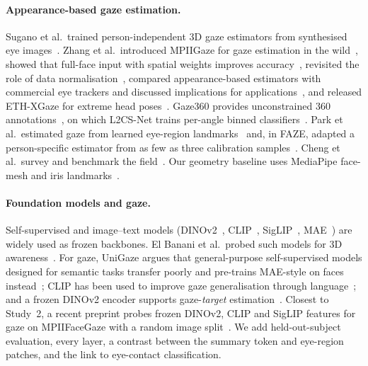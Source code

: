 \documentclass[10pt,twocolumn]{article}
\begin{document}
\paragraph{Appearance-based gaze estimation.}
Sugano et al.\ trained person-independent 3D gaze estimators from synthesised eye images~\cite{sugano2014learning}.
Zhang et al.\ introduced MPIIGaze for gaze estimation in the wild~\cite{zhang2015mpiigaze,zhang2019mpiigaze}, showed
that full-face input with spatial weights improves accuracy~\cite{zhang2017fullface}, revisited the role of data
normalisation~\cite{zhang2018revisiting}, compared appearance-based estimators with commercial eye trackers and
discussed implications for applications~\cite{zhang2019evaluation}, and released ETH-XGaze for extreme head poses~\cite{zhang2020ethxgaze}.
Gaze360 provides unconstrained 360\textdegree{} annotations~\cite{kellnhofer2019gaze360}, on which L2CS-Net trains
per-angle binned classifiers~\cite{abdelrahman2023l2cs}. Park et al.\ estimated gaze from learned eye-region
landmarks~\cite{park2018learning} and, in FAZE, adapted a person-specific estimator from as few as three calibration
samples~\cite{park2019faze}. Cheng et al.\ survey and benchmark the field~\cite{cheng2024survey}. Our geometry
baseline uses MediaPipe face-mesh and iris landmarks~\cite{lugaresi2019mediapipe,kartynnik2019facemesh,ablavatski2020iris}.

\paragraph{Foundation models and gaze.}
Self-supervised and image--text models (DINOv2~\cite{oquab2024dinov2}, CLIP~\cite{radford2021clip},
SigLIP~\cite{zhai2023siglip}, MAE~\cite{he2022mae}) are widely used as frozen backbones. El Banani et al.\ probed such
models for 3D awareness~\cite{elbanani2024probing}. For gaze, UniGaze argues that general-purpose self-supervised
models designed for semantic tasks transfer poorly and pre-trains MAE-style on faces instead~\cite{qin2026unigaze};
CLIP has been used to improve gaze generalisation through language~\cite{yin2024clipgaze}; and a frozen DINOv2 encoder
supports gaze-\emph{target} estimation~\cite{ryan2025gazelle}. Closest to Study~2, a recent preprint probes frozen
DINOv2, CLIP and SigLIP features for gaze on MPIIFaceGaze with a random image split~\cite{shkolnikov2026geometry}.
We add held-out-subject evaluation, every layer, a contrast between the summary token and eye-region patches, and
the link to eye-contact classification.
\end{document}
